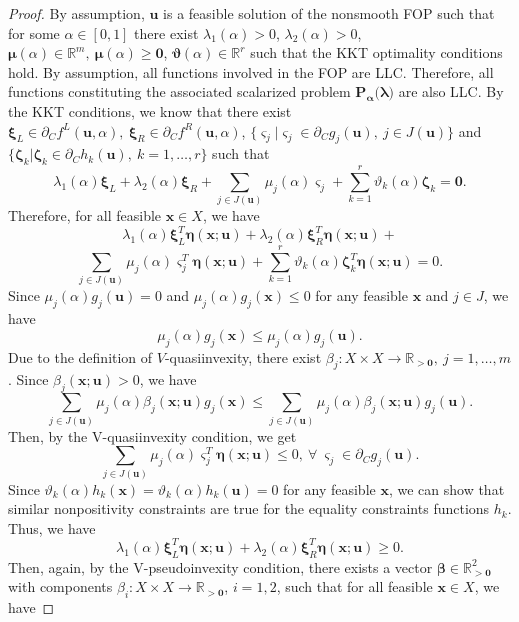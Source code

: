 \documentclass[10pt,a4paper]{amsart}
\begin{document}
\begin{proof} By assumption, $\boldsymbol u$ is a feasible solution of the nonsmooth FOP such that for some $ \alpha \in [0,1]$ there exist $\lambda_1( \alpha) > 0$, $\lambda_2( \alpha) > 0$, $\boldsymbol { \mu}( \alpha) \in \mathbb R^{m},\ \boldsymbol{ \mu}( \alpha) \geq \boldsymbol 0$, $\boldsymbol { \vartheta}( \alpha) \in \mathbb R^r$ such that the KKT optimality conditions hold. By assumption, all functions involved in the FOP are LLC. Therefore, all functions constituting the associated scalarized problem $\boldsymbol {P_{\alpha}({\boldsymbol \lambda)}}$ are also LLC. By the KKT conditions, we know that there exist $\boldsymbol \xi_L \in \partial_C f^L(\boldsymbol u,  \alpha),\ \boldsymbol \xi_R \in \partial_C f^R(\boldsymbol u,  \alpha)$, $\{\boldsymbol \varsigma_j | \boldsymbol \varsigma_j \in \partial_C g_j(\boldsymbol u),\ j \in J(\boldsymbol{u})\}$ and $\{\boldsymbol \zeta_k | \boldsymbol \zeta_k \in \partial_C h_k(\boldsymbol u),\ k=1,\dots,r\}$ such that
$$ \lambda_1( \alpha) \boldsymbol \xi_L +  \lambda_2( \alpha) \boldsymbol \xi_R + \sum_{j \in J(\boldsymbol{u})} \mu_j( \alpha) \boldsymbol \varsigma_j + \sum_{k=1}^r \vartheta_k( \alpha) \boldsymbol \zeta_k = \boldsymbol 0.$$
Therefore, for all feasible $\boldsymbol x\in X$, we have 
$$ \lambda_1( \alpha) \boldsymbol \xi_{L}^T \boldsymbol \eta(\boldsymbol x; \boldsymbol u) +  \lambda_2( \alpha) \boldsymbol \xi_{R}^T \boldsymbol \eta(\boldsymbol x; \boldsymbol u) +$$ $$\sum_{j \in J(\boldsymbol{u})} \mu_j( \alpha) \boldsymbol \varsigma_j^T \boldsymbol \eta(\boldsymbol x; \boldsymbol u)+\sum_{k=1}^r \vartheta_k( \alpha) \boldsymbol \zeta^T_k \boldsymbol \eta(\boldsymbol x; \boldsymbol u) = 0.$$
Since $ \mu_j( \alpha) g_j(\boldsymbol u) = 0$ and $ \mu_j( \alpha) g_j(\boldsymbol x) \leq 0$ for any feasible $\boldsymbol x$ and $j\in J$, we have $$ \mu_j( \alpha) g_j(\boldsymbol x) \leq  \mu_j( \alpha) g_j(\boldsymbol u).$$
Due to the definition of $V$-quasiinvexity, there exist $\beta_j : X \times X \rightarrow \mathbb R_{> \boldsymbol 0},\ j=1,\dots,m$. Since $\beta_j(\boldsymbol x; \boldsymbol u) > 0$, we have 
$$\sum_{j \in J(\boldsymbol{u})}  \mu_j( \alpha) \beta_j(\boldsymbol x; \boldsymbol u) g_j(\boldsymbol x) \leq \sum_{j \in J(\boldsymbol{u})}  \mu_j( \alpha) \beta_j(\boldsymbol x; \boldsymbol u) g_j(\boldsymbol u).$$
Then, by the V-quasiinvexity condition, we get
$$\sum_{j \in J(\boldsymbol{u})}  \mu_j( \alpha) \boldsymbol \varsigma_j^T \boldsymbol \eta(\boldsymbol x; \boldsymbol u) \leq 0,\ \forall\ \boldsymbol \varsigma_j \in \partial_C g_j(\boldsymbol u).$$
Since $ \vartheta_k( \alpha) h_k(\boldsymbol x) =  \vartheta_k( \alpha) h_k(\boldsymbol u) = 0$ for any feasible $\boldsymbol x$, we can show that similar nonpositivity constraints are true for the equality constraints functions $h_k$. Thus, we have
$$ \lambda_1( \alpha) \boldsymbol \xi_{L}^T \boldsymbol \eta(\boldsymbol x; \boldsymbol u) +  \lambda_2( \alpha) \boldsymbol \xi_{R}^T \boldsymbol \eta(\boldsymbol x; \boldsymbol u) \geq 0.$$
Then, again, by the V-pseudoinvexity condition, there exists a vector $\boldsymbol \beta\in \mathbb R^2_{> \boldsymbol 0}$ with components $\beta_i: X \times X \rightarrow \mathbb R_{> \boldsymbol 0}$, $i=1,2$, such that for all feasible $\boldsymbol x\in X$,  we have


\end{proof}
\end{document}
